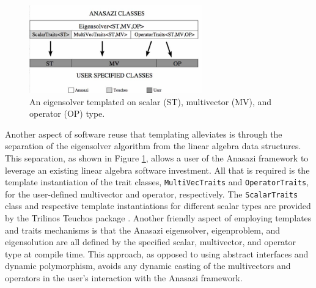 \documentclass[acmtoms,acmnow]{acmtrans2m}
\newcommand{\aspace}[1]{\texttt{#1}}
\begin{document}
\begin{figure}[htb]
\label{fig:latemplate}
\begin{center}
\includegraphics[height=1.5in]{anasazi_linalg_template}
\end{center}
\caption{An eigensolver templated on scalar (ST), multivector (MV), and
operator (OP) type.}
\end{figure}

Another aspect of software reuse that templating alleviates is through the separation of the
eigensolver algorithm from the linear algebra data structures.  This separation, as shown in
Figure \ref{fig:latemplate}, allows a user of the Anasazi framework to leverage an existing 
linear algebra software investment.  All that is required is the template instantiation of the trait
classes, \aspace{MultiVecTraits} and \aspace{OperatorTraits}, for the user-defined multivector 
and operator, respectively.  The \aspace{ScalarTraits} class and respective template 
instantiations for different scalar types are provided by the Trilinos Teuchos package 
\cite{Trilinos:Teuchos}. Another friendly aspect of employing templates and traits mechanisms
is that the Anasazi eigensolver, eigenproblem, and eigensolution are all defined by the 
specified scalar, multivector, and operator type at compile time.  This approach, as opposed to
using abstract interfaces and dynamic polymorphism, avoids any dynamic casting of the multivectors 
and operators in the user's interaction with the Anasazi framework.


\end{document}
